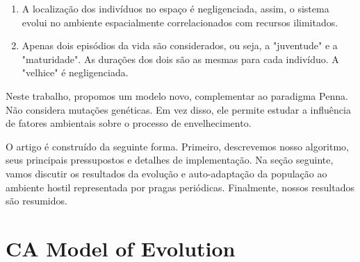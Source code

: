 \documentclass{article}
\begin{document}
\begin{enumerate}

\item A localização dos indivíduos no espaço é negligenciada, assim, o sistema evolui no ambiente espacialmente correlacionados com recursos ilimitados.


\item Apenas dois episódios da vida são considerados, ou seja, a "juventude" e a "maturidade". As durações dos dois são as mesmas para cada indivíduo. A "velhice" é negligenciada.
\end{enumerate}


Neste trabalho, propomos um modelo novo, complementar ao paradigma Penna. Não considera mutações genéticas. Em vez disso, ele permite estudar a influência de fatores ambientais sobre o processo de envelhecimento.


O artigo é construído da seguinte forma. Primeiro, descrevemos nosso algoritmo, seus principais pressupostos e detalhes de implementação. Na seção seguinte, vamos discutir os resultados da evolução e auto-adaptação da população ao ambiente hostil representada por pragas periódicas. Finalmente, nossos resultados são resumidos.

\newpage


\section{CA Model of Evolution}
\end{document}
